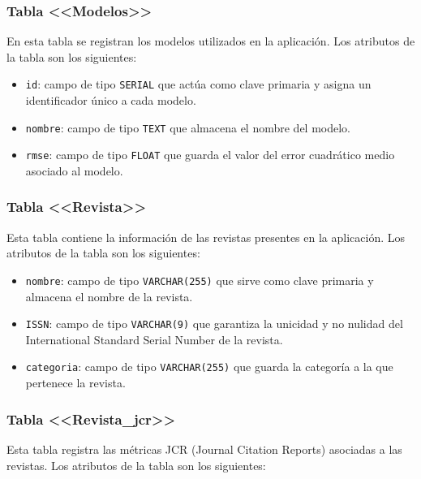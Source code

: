 \subsubsection{Tabla <<Modelos>>}

En esta tabla se registran los modelos utilizados en la aplicación. Los atributos de la tabla son los siguientes:
\begin{itemize}
    \item \texttt{id}: campo de tipo \texttt{SERIAL}  que actúa como clave primaria y asigna un identificador único a cada modelo.
    \item \texttt{nombre}: campo de tipo \texttt{TEXT} que almacena el nombre del modelo.
    \item \texttt{rmse}: campo de tipo \texttt{FLOAT} que guarda el valor del error cuadrático medio asociado al modelo.
\end{itemize}


\subsubsection{Tabla <<Revista>>}

Esta tabla contiene la información de las revistas presentes en la aplicación. Los atributos de la tabla son los siguientes:
\begin{itemize}
    \item \texttt{nombre}: campo de tipo \texttt{VARCHAR(255)} que sirve como clave primaria y almacena el nombre de la revista.
    \item \texttt{ISSN}: campo de tipo \texttt{VARCHAR(9)} que garantiza la unicidad y no nulidad del International Standard Serial Number de la revista.
    \item \texttt{categoria}: campo de tipo \texttt{VARCHAR(255)} que guarda la categoría a la que pertenece la revista.
\end{itemize}

\subsubsection{Tabla <<Revista\_jcr>>}

Esta tabla registra las métricas JCR (Journal Citation Reports) asociadas a las revistas. Los atributos de la tabla son los siguientes:

